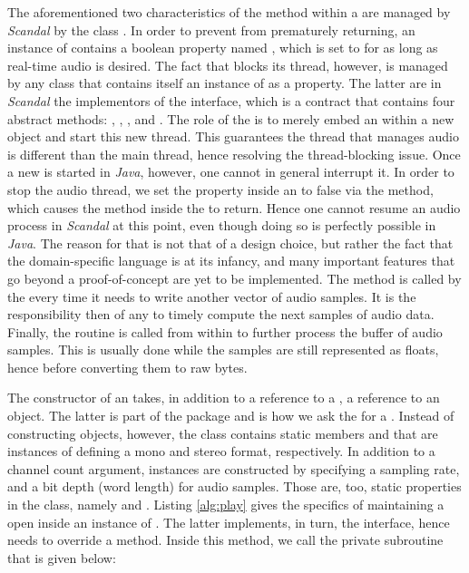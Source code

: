The aforementioned two characteristics of the  method within a  are managed by \emph{Scandal} by the class . In order to prevent  from prematurely returning, an instance of  contains a boolean property named , which is set to  for as long as real-time audio is desired. The fact that  blocks its thread, however, is managed by any class that contains itself an instance of  as a property. The latter are in \emph{Scandal} the implementors of the  interface, which is a contract that contains four abstract methods: , , , and . The role of the  is to merely embed an  within a new  object and start this new thread. This guarantees the thread that manages audio is different than the main  thread, hence resolving the thread-blocking issue. Once a new  is started in \emph{Java}, however, one cannot in general interrupt it. In order to stop the audio thread, we set the property  inside an  to false via the  method, which causes the  method inside the  to return. Hence one cannot resume an audio process in \emph{Scandal} at this point, even though doing so is perfectly possible in \emph{Java}. The reason for that is not that of a design choice, but rather the fact that the domain-specific language is at its infancy, and many important features that go beyond a proof-of-concept are yet to be implemented. The  method is called by the  every time it needs to write another vector of audio samples. It is the responsibility then of any  to timely compute the next  samples of audio data. Finally, the  routine is called from within  to further process the buffer of audio samples. This is usually done while the samples are still represented as floats, hence before converting them to raw bytes.

The constructor of an  takes, in addition to a reference to a , a reference to an  object. The latter is part of the  package and is how we ask the  for a . Instead of constructing  objects, however, the  class contains static members  and  that are instances of  defining a mono and stereo format, respectively. In addition to a channel count argument,  instances are constructed by specifying a sampling rate, and a bit depth (word length) for audio samples. Those are, too, static properties in the  class, namely  and . Listing \ref{alg:play} gives the specifics of maintaining a  open inside an instance of . The latter implements, in turn, the  interface, hence needs to override a  method. Inside this  method, we call the private  subroutine that is given below:

